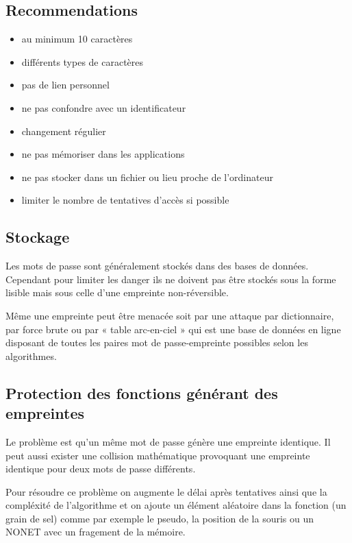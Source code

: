 \documentclass[12pt, a4paper]{article}
\begin{document}
	\subsection{Recommendations}
	\begin{itemize}
		\item au minimum 10 caractères
		\item différents types de caractères
		\item pas de lien personnel
		\item ne pas confondre avec un identificateur
		\item changement régulier
		\item ne pas mémoriser dans les applications
		\item ne pas stocker dans un fichier ou lieu proche de l'ordinateur
		\item limiter le nombre de tentatives d'accès si possible
	\end{itemize}
	\subsection{Stockage}
	Les mots de passe sont généralement stockés dans des bases de données. Cependant pour limiter les danger ils ne doivent pas être stockés sous la forme lisible mais sous celle d'une empreinte non-réversible.
	\par
	Même une empreinte peut être menacée soit par une attaque par dictionnaire, par force brute ou par « table arc-en-ciel » qui est une base de données en ligne disposant de toutes les paires mot de passe-empreinte possibles selon les algorithmes.
	\subsection{Protection des fonctions générant des empreintes}
	Le problème est qu'un même mot de passe génère une empreinte identique. Il peut aussi exister une collision mathématique provoquant une empreinte identique pour deux mots de passe différents.
	\par
	Pour résoudre ce problème on augmente le délai après tentatives ainsi que la compléxité de l'algorithme et on ajoute un élément aléatoire dans la fonction (un grain de sel) comme par exemple le pseudo, la position de la souris ou un NONET avec un fragement de la mémoire.
\end{document}
